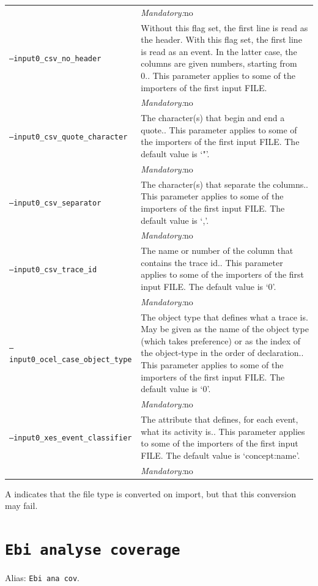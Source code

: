 {\begin{tabularx}{\linewidth}{lX}
&\textit{Mandatory:}\quad no\\
\texttt{--input0\_csv\_no\_header} & Without this flag set, the first line is read as the header. 
    With this flag set, the first line is read as an event. In the latter case, the columns are given numbers, starting from 0.. This parameter applies to some of the importers of the first input FILE. \\
&\textit{Mandatory:}\quad no\\
\texttt{--input0\_csv\_quote\_character} & The character(s) that begin and end a quote.. This parameter applies to some of the importers of the first input FILE. The default value is `"'.\\
&\textit{Mandatory:}\quad no\\
\texttt{--input0\_csv\_separator} & The character(s) that separate the columns.. This parameter applies to some of the importers of the first input FILE. The default value is `,'.\\
&\textit{Mandatory:}\quad no\\
\texttt{--input0\_csv\_trace\_id} & The name or number of the column that contains the trace id.. This parameter applies to some of the importers of the first input FILE. The default value is `0'.\\
&\textit{Mandatory:}\quad no\\
\texttt{--input0\_ocel\_case\_object\_type} & The object type that defines what a trace is. May be given as the name of the object type (which takes preference) or as the index of the object-type in the order of declaration.. This parameter applies to some of the importers of the first input FILE. The default value is `0'.\\
&\textit{Mandatory:}\quad no\\
\texttt{--input0\_xes\_event\_classifier} & The attribute that defines, for each event, what its activity is.. This parameter applies to some of the importers of the first input FILE. The default value is `concept:name'.\\
&\textit{Mandatory:}\quad no\\
\bottomrule
\end{tabularx}
A \textdagger{} indicates that the file type is converted on import, but that this conversion may fail.
\clearpage\section{\texttt{Ebi analyse coverage}}
\label{command:Ebi analyse coverage}
Alias: \texttt{Ebi ana cov}.\\
}
